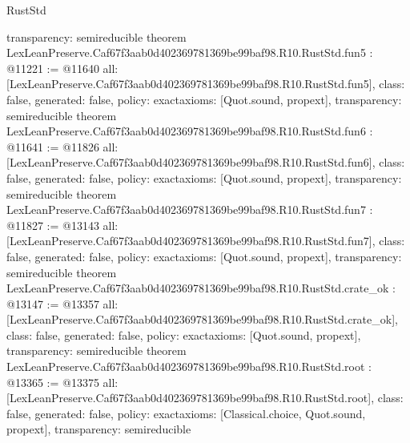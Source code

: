 \begin{lexlean}{RustStd}
\begin{coremodule}
{  transparency: semireducible
}
theorem LexLeanPreserve.Caf67f3aab0d402369781369be99baf98.R10.RustStd.fun5 : @11221 := @11640 {
  all: [LexLeanPreserve.Caf67f3aab0d402369781369be99baf98.R10.RustStd.fun5],
  class: false,
  generated: false,
  policy: exact{axioms: [Quot.sound, propext]},
  transparency: semireducible
}
theorem LexLeanPreserve.Caf67f3aab0d402369781369be99baf98.R10.RustStd.fun6 : @11641 := @11826 {
  all: [LexLeanPreserve.Caf67f3aab0d402369781369be99baf98.R10.RustStd.fun6],
  class: false,
  generated: false,
  policy: exact{axioms: [Quot.sound, propext]},
  transparency: semireducible
}
theorem LexLeanPreserve.Caf67f3aab0d402369781369be99baf98.R10.RustStd.fun7 : @11827 := @13143 {
  all: [LexLeanPreserve.Caf67f3aab0d402369781369be99baf98.R10.RustStd.fun7],
  class: false,
  generated: false,
  policy: exact{axioms: [Quot.sound, propext]},
  transparency: semireducible
}
theorem LexLeanPreserve.Caf67f3aab0d402369781369be99baf98.R10.RustStd.crate_ok : @13147 := @13357 {
  all: [LexLeanPreserve.Caf67f3aab0d402369781369be99baf98.R10.RustStd.crate_ok],
  class: false,
  generated: false,
  policy: exact{axioms: [Quot.sound, propext]},
  transparency: semireducible
}
theorem LexLeanPreserve.Caf67f3aab0d402369781369be99baf98.R10.RustStd.root : @13365 := @13375 {
  all: [LexLeanPreserve.Caf67f3aab0d402369781369be99baf98.R10.RustStd.root],
  class: false,
  generated: false,
  policy: exact{axioms: [Classical.choice, Quot.sound, propext]},
  transparency: semireducible
}


\end{coremodule}
\end{lexlean}
